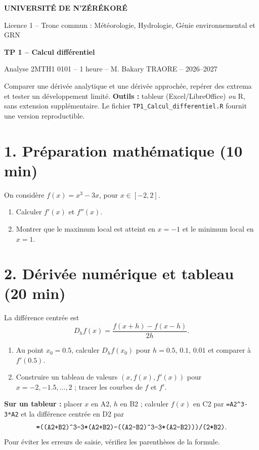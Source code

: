 \documentclass[11pt,a4paper]{article}
\begin{document}
\begin{tcolorbox}[enhanced,colback=Bleu,colframe=Bleu,sharp corners,boxrule=0pt]
\centering
{\color{white}\large\bfseries UNIVERSITÉ DE N'ZÉRÉKORÉ\par}
{\color{white!90}Licence 1 -- Tronc commun : Météorologie, Hydrologie, Génie environnemental et GRN\par}\vspace{2mm}
{\color{white}\LARGE\bfseries TP 1 -- Calcul différentiel\par}
{\color{white!90}Analyse 2MTH1 0101 -- 1 heure -- M. Bakary TRAORE -- 2026--2027\par}
\end{tcolorbox}

\begin{tcolorbox}[colback=Pale,colframe=Sarcelle,title=\textbf{Objectif et matériel}]
Comparer une dérivée analytique et une dérivée approchée, repérer des extrema et tester un développement limité. \textbf{Outils :} tableur (Excel/LibreOffice) \emph{ou} R, sans extension supplémentaire. Le fichier \texttt{TP1\_Calcul\_differentiel.R} fournit une version reproductible.
\end{tcolorbox}

\section*{1. Préparation mathématique (10 min)}
On considère $f(x)=x^3-3x$, pour $x\in[-2,2]$.
\begin{enumerate}
\item Calculer $f'(x)$ et $f''(x)$.
\item Montrer que le maximum local est atteint en $x=-1$ et le minimum local en $x=1$.
\end{enumerate}

\section*{2. Dérivée numérique et tableau (20 min)}
La différence centrée est
\[D_hf(x)=\frac{f(x+h)-f(x-h)}{2h}.\]
\begin{enumerate}[resume]
\item Au point $x_0=0.5$, calculer $D_hf(x_0)$ pour $h=0.5$, $0.1$, $0.01$ et comparer à $f'(0.5)$.
\item Construire un tableau de valeurs $(x,f(x),f'(x))$ pour $x=-2,-1.5,\ldots,2$ ; tracer les courbes de $f$ et $f'$.
\end{enumerate}
\textbf{Sur un tableur :} placer $x$ en A2, $h$ en B2 ; calculer $f(x)$ en C2 par \texttt{=A2\string^3-3*A2} et la différence centrée en D2 par
\[\texttt{=((A2+B2)\string^3-3*(A2+B2)-((A2-B2)\string^3-3*(A2-B2)))/(2*B2)}.\]
Pour éviter les erreurs de saisie, vérifiez les parenthèses de la formule.
\end{document}
